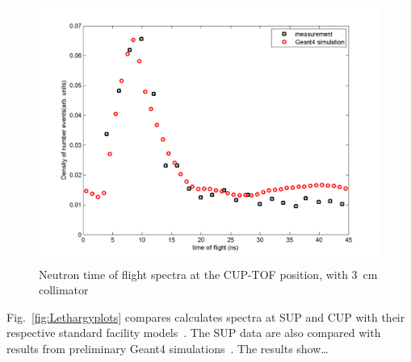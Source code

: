 \documentclass[11pt,a4paper]{IEEEtran}
\let\MYoriglatexcaption\caption
\renewcommand{\caption}[2][\relax]{\MYoriglatexcaption[#2]{#2}}
\begin{document}
\begin{figure}[t]
    \includegraphics[width=\columnwidth]{CUPTOFtofspectraRADECS.png}
    \caption{
        Neutron time of flight spectra at the CUP-TOF position, with \SI{3}{\cm} collimator
        }
    \label{fig:TOFSpectra}
\end{figure}




Fig.~\ref{fig:Lethargyplots} compares calculates spectra at SUP and CUP with their respective standard facility models~\cite{Prokofiev2009,Prokofiev14}.
The SUP data are also compared with results from preliminary Geant4 simulations~\cite{Platt13}.
The results show\ldots
{}
\end{document}
